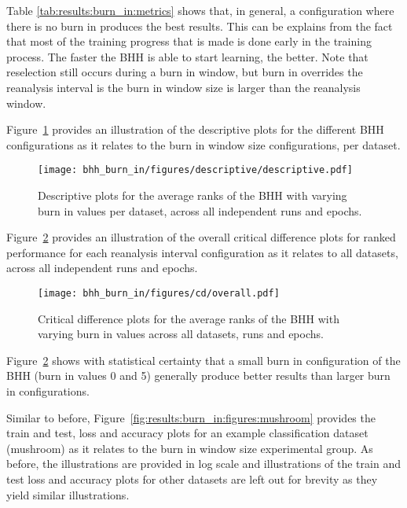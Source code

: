 \begin{table}[htb]
{	}
\end{table}%

Table \ref{tab:results:burn_in:metrics} shows that, in general, a configuration where there is no burn in produces the best results. This can be explains from the fact that most of the training progress that is made is done early in the training process. The faster the \acs{BHH} is able to start learning, the better. Note that reselection still occurs during a burn in window, but burn in overrides the reanalysis interval is the burn in window size is larger than the reanalysis window.

Figure~\ref{fig:results:burn_in:descriptive:descriptive} provides an illustration of the descriptive plots for the different \acs{BHH} configurations as it relates to the burn in window size configurations, per dataset.

\begin{figure}[htb]
	\centering
	\texttt{[image: bhh\_burn\_in/figures/descriptive/descriptive.pdf]}
	\caption{Descriptive plots for the average ranks of the \acs{BHH} with varying burn in values per dataset, across all independent runs and epochs.}
	\label{fig:results:burn_in:descriptive:descriptive}
\end{figure}

Figure~\ref{fig:results:burn_in:descriptive:cd} provides an illustration of the overall critical difference plots for ranked performance for each reanalysis interval configuration as it relates to all datasets, across all independent runs and epochs.

\begin{figure}[htb]
	\centering
	\texttt{[image: bhh\_burn\_in/figures/cd/overall.pdf]}
	\caption{Critical difference plots for the average ranks of the \acs{BHH} with varying burn in values across all datasets, runs and epochs.}
	\label{fig:results:burn_in:descriptive:cd}
\end{figure}

Figure~\ref{fig:results:burn_in:descriptive:cd} shows with statistical certainty that a small burn in configuration of the \acs{BHH} (burn in values 0 and 5) generally produce better results than larger burn in configurations.


Similar to before, Figure~\ref{fig:results:burn_in:figures:mushroom} provides the train and test, loss and accuracy plots for an example classification dataset (mushroom) as it relates to the burn in window  size experimental group. As before, the illustrations are provided in log scale and illustrations of the train and test loss and accuracy plots for other datasets are left out for brevity as they yield similar illustrations.

